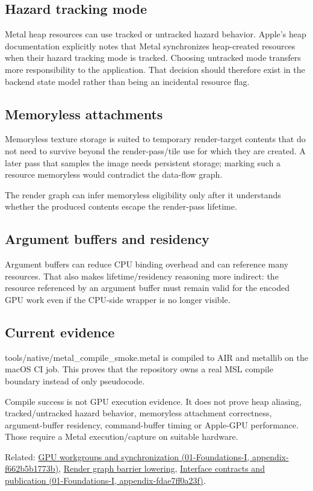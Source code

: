 \subsection{Hazard tracking mode}\label{hazard-tracking-mode}

Metal heap resources can use tracked or untracked hazard behavior. Apple's heap documentation explicitly notes that Metal synchronizes heap-created resources when their hazard tracking mode is tracked. Choosing untracked mode transfers more responsibility to the application. That decision should therefore exist in the backend state model rather than being an incidental resource flag.

\subsection{Memoryless attachments}\label{memoryless-attachments}

Memoryless texture storage is suited to temporary render-target contents that do not need to survive beyond the render-pass/tile use for which they are created. A later pass that samples the image needs persistent storage; marking such a resource memoryless would contradict the data-flow graph.

The render graph can infer memoryless eligibility only after it understands whether the produced contents escape the render-pass lifetime.

\subsection{Argument buffers and residency}\label{argument-buffers-and-residency}

Argument buffers can reduce CPU binding overhead and can reference many resources. That also makes lifetime/residency reasoning more indirect: the resource referenced by an argument buffer must remain valid for the encoded GPU work even if the CPU-side wrapper is no longer visible.

\subsection{Current evidence}\label{current-evidence}

tools/native/metal\_compile\_smoke.metal is compiled to AIR and metallib on the macOS CI job. This proves that the repository owns a real MSL compile boundary instead of only pseudocode.

Compile success is not GPU execution evidence. It does not prove heap aliasing, tracked/untracked hazard behavior, memoryless attachment correctness, argument-buffer residency, command-buffer timing or Apple-GPU performance. Those require a Metal execution/capture on suitable hardware.

Related: \href{}{GPU workgroups and synchronization (01-Foundations-I, appendix-f662b5b1773b)}, \hyperref[appendix-0fc95374cb7e]{Render graph barrier lowering}, \href{}{Interface contracts and publication (01-Foundations-I, appendix-fdae7ff0a23f)}.
